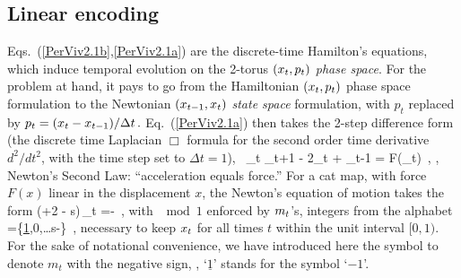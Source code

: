 \documentclass[12pt]{iopart}
\begin{document}
\subsection{Linear encoding}
\label{sect:catLinSymDyn}
\renewcommand{\statesp}{state space}
\renewcommand{\Statesp}{State space}
\renewcommand{\stateDsp}{state-space}
\renewcommand{\StateDsp}{State-space}

Eqs.~(\ref{PerViv2.1b},\ref{PerViv2.1a}) are the discrete-time Hamilton's
equations, which induce temporal evolution on the 2-torus
$(x_{t},p_{t})$ {\em phase space}. For the problem at hand, it pays to
go from the Hamiltonian $(x_{t},p_{t})$ phase space formulation to the
Newtonian $(x_{t-1},x_{t})$ {\em \statesp} formulation,
with $p_t$ replaced by
\(
p_t = (x_{t} - x_{t-1})/\Delta t \,.
\)
Eq.~(\ref{PerViv2.1a}) then takes the 2-step difference form (the discrete
time Laplacian $\Box$ formula for the second order time derivative
${d^2}/{dt^2}$, with the time step set to $\Delta t=1$),
\beq
\Box \, \ssp_t \equiv \ssp_{t+1} - 2\ssp_{t} + \ssp_{t-1} = F(\ssp_{t})  \qquad  {}
\,,
\ie, Newton's Second Law: ``acceleration equals force.''
For a cat map, with force $F(x)$ linear in the displacement $x$, the
Newton's equation of motion  takes the form
\beq
(\Box  +2 - s)\,\ssp_{t} =-
\,,
with $\mod 1$ enforced by ${m_{t}}$'s, integers from  the alphabet
\beq
\A=\{\underline{1},0,\dots s\!-\}
\,,
necessary  to keep $x_{t}$ for all times $t$ within the unit interval
$[0,1)$.
For the sake of notational convenience, we have introduced here the
symbol
to denote $m_t$ with the negative sign, \ie, `$\underline{1}$' stands for
the symbol `$-1$'.
\end{document}
